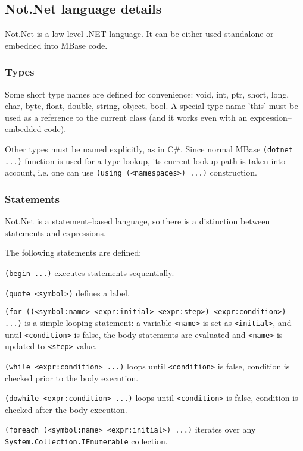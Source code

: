 \subsection{Not.Net language details}

Not.Net is a low level .NET language. It can be either used standalone or
embedded into MBase code.

\subsubsection{Types}

 Some short type names are defined for convenience: void, int, ptr, 
short, long, char, byte,
float, double, string, object, bool. A special type name 'this' must be used
as a reference to the current class (and it works even with an 
expression--embedded code).

 Other types must be named explicitly, as in C\#. Since 
normal MBase {\tt(dotnet ...)} function is used for a type lookup, its current
lookup path is taken into account, i.e. one can use 
{\tt(using (<namespaces>) ...)} construction.

\subsubsection{Statements}

 Not.Net is a statement--based language, so there is a distinction between 
statements and expressions.

 The following statements are defined:

{\tt (begin ...)} executes statements sequentially.

{\tt (quote <symbol>)} defines a label.

{\tt (for ((<symbol:name> <expr:initial> <expr:step>) <expr:condition>) ...)}
 is a simple looping statement: a variable {\tt <name>} is set as {\tt <initial>},
and until {\tt <condition>} is false, the body statements are evaluated and
{\tt <name>} is updated to {\tt <step>} value.

{\tt (while <expr:condition> ...)}
  loops until {\tt <condition>} is false, condition is checked prior to 
the body execution.

{\tt (dowhile <expr:condition> ...)}
  loops until {\tt <condition>} is false, condition is checked after the body
execution.

{\tt (foreach (<symbol:name> <expr:initial>) ...)}
  iterates over any {\tt System.Collection.IEnumerable} collection.

